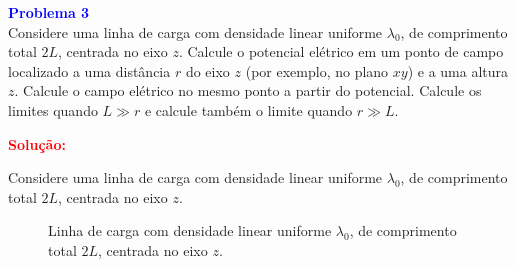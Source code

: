 \documentclass[a4paper,12pt]{article}
\begin{document}
\begin{flushleft}
\textbf{\textcolor{blue}{\Large Problema 3}}\\
Considere uma linha de carga com densidade linear uniforme \( \lambda_0 \), de comprimento 
total \( 2L \), centrada no eixo \( z \). Calcule o potencial elétrico em um ponto de campo 
localizado a uma distância \( r \) do eixo \( z \) (por exemplo, no plano \( xy \)) e a uma 
altura \( z \). Calcule o campo elétrico no mesmo ponto a partir do potencial. Calcule os limites 
quando \( L \gg r \) e calcule também o limite quando \( r \gg L \).

\textcolor{red}{\textbf{Solução:}}\\
\end{flushleft}

Considere uma linha de carga com densidade linear uniforme \( \lambda_0 \), de comprimento total \( 2L \), 
centrada no eixo \( z \).

\begin{figure}[h!]
\begin{center}
\end{center}
\caption{Linha de carga com densidade linear uniforme \( \lambda_0 \), de comprimento total \( 2L \), 
centrada no eixo \( z \).}
\end{figure}
\end{document}
